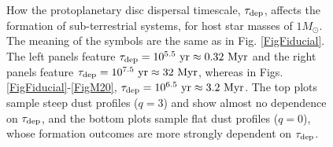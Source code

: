 \documentclass[useAMS,usenatbib]{mn2e}
\begin{document}
\begin{figure}
{}
\caption{
How the protoplanetary disc dispersal timescale, $\tau_{\rm dep}$, affects the formation of sub-terrestrial systems, for host star masses of $1M_{\odot}$. The meaning of the symbols are the same as in Fig. \ref{FigFiducial}. The left panels feature $\tau_{\rm dep} = 10^{5.5}~{\rm yr}\approx 0.32~{\rm Myr}$ and the right panels feature $\tau_{\rm dep} = 10^{7.5}~{\rm yr}\approx 32~{\rm Myr}$, whereas in Figs. \ref{FigFiducial}-\ref{FigM20}, $\tau_{\rm dep} = 10^{6.5}~{\rm yr}\approx 3.2~{\rm Myr}$. The top plots sample steep dust profiles ($q=3$) and show almost no dependence on $\tau_{\rm dep}$, and the bottom plots sample flat dust profiles ($q=0$), whose formation outcomes are more strongly dependent on $\tau_{\rm dep}$.
}
\label{Figtdep}
\end{figure}
\end{document}
